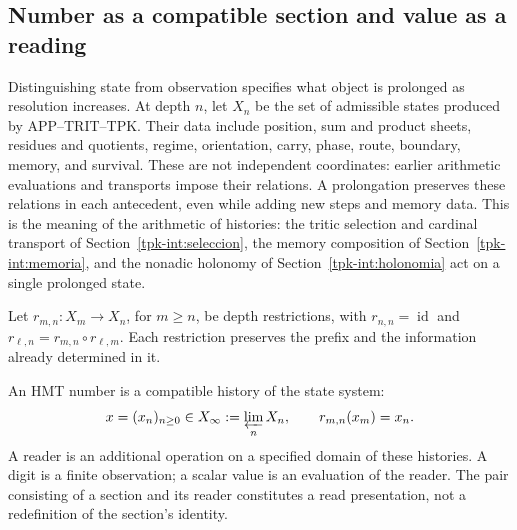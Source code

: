 
\subsection{Number as a compatible section and value as a reading}
\label{hist:seccion}

Distinguishing state from observation specifies what object is prolonged
as resolution increases. At depth \(n\), let \(X_n\) be the set of
admissible states produced by APP--TRIT--TPK. Their data include position,
sum and product sheets, residues and quotients, regime, orientation,
carry, phase, route, boundary, memory, and survival. These are not
independent coordinates: earlier arithmetic evaluations and transports
impose their relations. A prolongation preserves these relations in
each antecedent, even while adding new steps and memory data.
This is the meaning of the arithmetic of histories: the tritic selection and
cardinal transport of Section~\ref{tpk-int:seleccion}, the memory composition
of Section~\ref{tpk-int:memoria}, and the nonadic holonomy of
Section~\ref{tpk-int:holonomia} act on a single prolonged state.

Let \(r_{m,n}:X_m\to X_n\), for \(m\geq n\), be depth
restrictions, with \(r_{n,n}=\operatorname{id}\) and
\(r_{\ell,n}=r_{m,n}\circ r_{\ell,m}\). Each restriction preserves
the prefix and the information already determined in it.

\begin{definition}
An HMT number is a compatible history of the state system:
\begin{equation}
 x=(x_n)_{n\geq0}\in X_\infty:=\varprojlim_n X_n,
 \qquad r_{m,n}(x_m)=x_n.
 \label{hist:limite-inverso}
\end{equation}
A reader is an additional operation on a specified domain of these
histories. A digit is a finite observation; a scalar value is an evaluation
of the reader. The pair consisting of a section and its reader constitutes
a read presentation, not a redefinition of the section's identity.
\end{definition}

